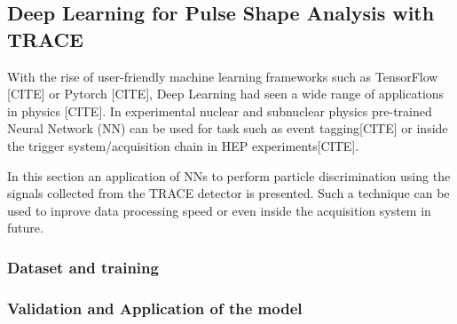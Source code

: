 \subsection{Deep Learning for Pulse Shape Analysis with TRACE}
With the rise of user-friendly machine learning frameworks such as TensorFlow [CITE] or Pytorch [CITE], Deep Learning had seen a wide range of applications in physics [CITE]. In experimental nuclear and subnuclear physics pre-trained Neural Network (NN) can be used for task such as event tagging[CITE] or inside the trigger system/acquisition chain in HEP experiments[CITE]. 


In this section an application of NNs to perform particle discrimination using the signals collected from the TRACE detector is presented. Such a technique can be used to inprove data processing speed or even inside the acquisition system in future.

\subsubsection{Dataset and training}

\subsubsection{Validation and Application of the model	}